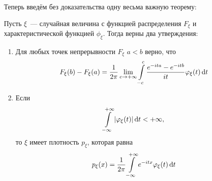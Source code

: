 Теперь введём без доказательства одну весьма важную теорему:
\begin{theorem}
	Пусть \(\xi\)~--- случайная величина с функцией распределения \(F_{\xi}\) и 
	характеристической функцией \(\phi_{\xi}\). Тогда верны два утверждения:
	\begin{enumerate}
		\item Для любых точек непрерывности \(F_{\xi}\) \(a < b\) верно, что
		\[
			F_{\xi}(b) - F_{\xi}(a) = \frac{1}{2\pi}\lim\limits_{c \to +\infty} 
			\int\limits_{-c}^{c} \frac{e^{-ita} - e^{-itb}}{it} 
			\varphi_{\xi}(t)\mathop{}\!\mathrm{d} t
		\]
		
		\item Если
		\[
			\int\limits_{-\infty}^{+\infty} |\varphi_{\xi}(t)|\mathop{}\!\mathrm{d} t < +\infty,
		\]
		то \(\xi\) имеет плотность \(p_{\xi}\), которая равна
		\[
			p_{\xi}(x) = \frac{1}{2\pi}\int\limits_{-\infty}^{+\infty} 
			e^{-itx}\varphi_{\xi}(t)\mathop{}\!\mathrm{d} t
		\]
	\end{enumerate}
\end{theorem}